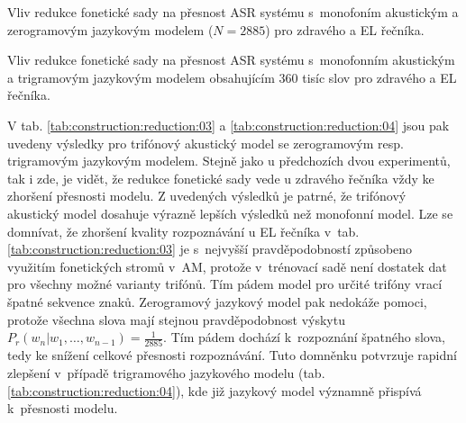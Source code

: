 \begin{table}[htpb]
  \centering
  \def\arraystretch{1.5}
  \caption[Vliv redukce na přesnost ASR s~mono. AM. a zerogram LM.]{Vliv redukce fonetické sady na přesnost ASR systému s~monofoním akustickým a zerogramovým jazykovým modelem ($N=2885$) pro zdravého a EL řečníka.}
  \label{tab:construction:reduction:01}
\end{table}

\begin{table}[htpb]
  \centering
  \def\arraystretch{1.5}
  \caption[Vliv redukce na přesnost ASR s~mono. AM. a 3-gram LM (N=360k).]{Vliv redukce fonetické sady na přesnost ASR systému s~monofonním akustickým a trigramovým jazykovým modelem obsahujícím 360 tisíc slov pro zdravého a EL řečníka.}
  \label{tab:construction:reduction:02}
\end{table}


V tab. \ref{tab:construction:reduction:03} a \ref{tab:construction:reduction:04} jsou pak uvedeny výsledky pro trifónový akustický model se zerogramovým resp. trigramovým jazykovým modelem.
Stejně jako u předchozích dvou experimentů, tak i zde, je vidět, že redukce fonetické sady vede u zdravého řečníka vždy ke zhoršení přesnosti modelu.
Z uvedených výsledků je patrné, že trifónový akustický model dosahuje výrazně lepších výsledků než monofonní model.
Lze se domnívat, že zhoršení kvality rozpoznávání u EL řečníka v~tab. \ref{tab:construction:reduction:03} je s~nejvyšší pravděpodobností způsobeno využitím fonetických stromů v~AM, protože v~trénovací sadě není dostatek dat pro všechny možné varianty trifónů.
Tím pádem model pro určité trifóny vrací špatné sekvence znaků.
Zerogramový jazykový model pak nedokáže pomoci, protože všechna slova mají stejnou pravděpodobnost výskytu $P_r(w_n|w_1,\dots,w_{n-1}) = \frac{1}{2885}$.
Tím pádem dochází  k~rozpoznání špatného slova, tedy ke snížení celkové přesnosti rozpoznávání.
Tuto domněnku potvrzuje rapidní zlepšení v~případě trigramového jazykového modelu (tab. \ref{tab:construction:reduction:04}), kde již jazykový model významně přispívá  k~přesnosti modelu.

